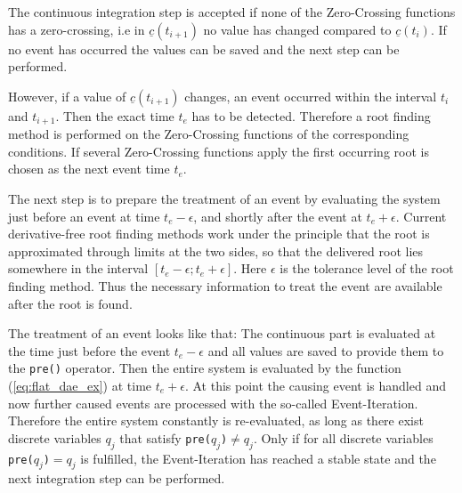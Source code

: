 The continuous integration step is accepted if none of the
Zero-Crossing functions has a zero-crossing, i.e in $\underline{c}(t_{i+1})$ no
value has changed compared to $\underline{c}(t_i)$.  
If no event has occurred the values can be saved and the next step can be performed.

However, if a value of $\underline{c}(t_{i+1})$ changes, an event occurred
within the interval $t_i$ and $ t_{i+1}$. Then the exact time $t_e$ has to be
detected. Therefore a root finding method is performed on the Zero-Crossing
functions of the corresponding conditions. If several Zero-Crossing functions
apply the first occurring root is chosen as the next event time $t_e$.

The next step is to prepare the treatment of an event by evaluating the system
just before an event at time $t_e - \epsilon $, and shortly after the event at $t_e +
\epsilon$. Current derivative-free root finding methods work under the
principle that the root is approximated through limits at the two sides,
so that the delivered root lies somewhere in the interval $[t_e - \epsilon;
t_e + \epsilon]$. Here $\epsilon$ is the tolerance level of the root finding
method. Thus the necessary information to treat the event are available after
the root is found.

The treatment of an event looks like that: The continuous part is evaluated at
the time just before the event $t_e - \epsilon$ and all values are saved to provide
them to the \verb+pre()+ operator. Then the entire system is evaluated
by the function (\ref{eq:flat_dae_ex}) at time $t_e + \epsilon$.
At this point the causing event is handled and now further caused events are
processed with the so-called Event-Iteration. Therefore the entire system
constantly is re-evaluated, as long as there exist discrete variables $q_j$
that satisfy \verb+pre(+$q_j$\verb+)+$\neq q_j$.  Only if for all discrete
variables \verb+pre(+$q_j$\verb+)+$ = q_j$ is fulfilled, the Event-Iteration
has reached a stable state and the next integration step can be performed.


